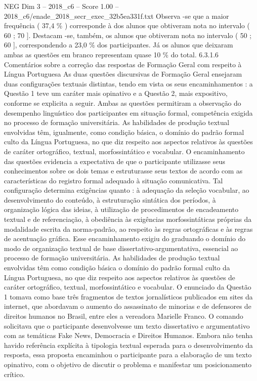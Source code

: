 \begin{textsample}{NEG Dim 3 – 2018\_c6 – Score 1.00 – 2018\_c6/enade\_2018\_secr\_exec\_32b5ea331f.txt}
Observa -se que a maior frequência ( 37,4 \% ) corresponde à dos alunos que obtiveram nota no intervalo ( 60 ; 70 ].
Destacam -se, também, os alunos que obtiveram nota no intervalo ( 50 ; 60 ], correspondendo a 23,0 \% dos participantes.
Já os alunos que deixaram ambas as questões em branco representam quase 10 \% do total. 6.3.1.6 Comentários sobre a correção das respostas de Formação Geral com respeito à Língua Portuguesa As duas questões discursivas de Formação Geral ensejaram duas configurações textuais distintas, tendo em vista os seus encaminhamentos : a Questão 1 teve um caráter mais opinativo e a Questão 2, mais expositivo, conforme se explicita a seguir.
Ambas as questões permitiram a observação do desempenho linguístico dos participantes em situação formal, competência exigida no processo de formação universitária.
As habilidades de produção textual envolvidas têm, igualmente, como condição básica, o domínio do padrão formal culto da Língua Portuguesa, no que diz respeito aos aspectos relativos às questões de caráter ortográfico, textual, morfossintático e vocabular.
O encaminhamento das questões evidencia a expectativa de que o participante utilizasse seus conhecimentos sobre os dois temas e estruturasse seus textos de acordo com as características do registro formal adequado à situação comunicativa.
Tal configuração determina exigências quanto : à adequação da seleção vocabular, ao desenvolvimento do conteúdo, à estruturação sintática dos períodos, à organização lógica das ideias, à utilização de procedimentos de encadeamento textual e de referenciação, à obediência às exigências morfossintáticas próprias da modalidade escrita da norma-padrão, ao respeito às regras ortográficas e às regras de acentuação gráfica.
Esse encaminhamento exigiu do graduando o domínio do modo de organização textual de base dissertativo-argumentativa, essencial ao processo de formação universitária.
As habilidades de produção textual envolvidas têm como condição básica o domínio do padrão formal culto da Língua Portuguesa, no que diz respeito aos aspectos relativos às questões de caráter ortográfico, textual, morfossintático e vocabular.
O enunciado da Questão 1 tomava como base três fragmentos de textos jornalísticos publicados em sites da internet, que abordavam o aumento do assassinato de minorias e de defensores de direitos humanos no Brasil, entre eles a vereadora Marielle Franco.
O comando solicitava que o participante desenvolvesse um texto dissertativo e argumentativo com as temáticas Fake News, Democracia e Direitos Humanos.
Embora não tenha havido referência explícita à tipologia textual esperada para o desenvolvimento da resposta, essa proposta encaminhou o participante para a elaboração de um texto opinativo, com o objetivo de discutir o problema e manifestar um posicionamento crítico.

\end{textsample}
